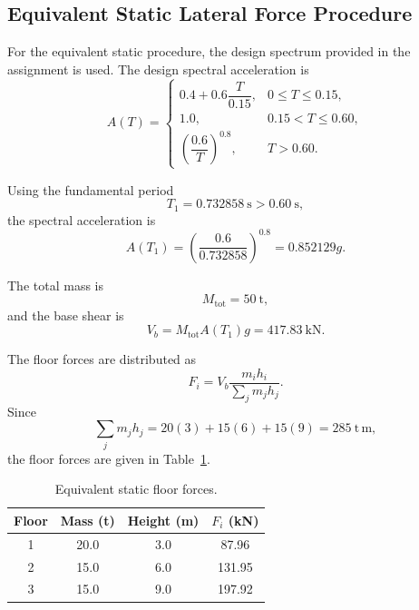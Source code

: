 \documentclass[11pt,a4paper]{article}
\begin{document}
\subsection{Equivalent Static Lateral Force Procedure}

For the equivalent static procedure, the design spectrum provided in the assignment is used. The design spectral acceleration is
\begin{equation}
A(T)=
\begin{cases}
0.4+0.6\dfrac{T}{0.15}, & 0\leq T\leq 0.15,\\[6pt]
1.0, & 0.15<T\leq 0.60,\\[6pt]
\left(\dfrac{0.6}{T}\right)^{0.8}, & T>0.60.
\end{cases}
\end{equation}

Using the fundamental period
\begin{equation}
T_1=0.732858\ \mathrm{s}>0.60\ \mathrm{s},
\end{equation}
the spectral acceleration is
\begin{equation}
A(T_1)=\left(\frac{0.6}{0.732858}\right)^{0.8}=0.852129g.
\end{equation}

The total mass is
\begin{equation}
M_{\mathrm{tot}}=50\ \mathrm{t},
\end{equation}
and the base shear is
\begin{equation}
\boxed{V_b=M_{\mathrm{tot}}A(T_1)g=417.83\ \mathrm{kN}}.
\end{equation}

The floor forces are distributed as
\begin{equation}
F_i=V_b\frac{m_ih_i}{\sum_jm_jh_j}.
\end{equation}
Since
\begin{equation}
\sum_jm_jh_j=20(3)+15(6)+15(9)=285\ \mathrm{t\,m},
\end{equation}
the floor forces are given in Table~\ref{tab:q4d_forces}.

\begin{table}[H]
\centering
\caption{Equivalent static floor forces.}
\begin{tabular}{cccc}
\toprule
Floor & Mass (t) & Height (m) & $F_i$ (kN)\\
\midrule
1 & 20.0 & 3.0 & 87.96\\
2 & 15.0 & 6.0 & 131.95\\
3 & 15.0 & 9.0 & 197.92\\
\bottomrule
\end{tabular}
\label{tab:q4d_forces}
\end{table}
\end{document}
